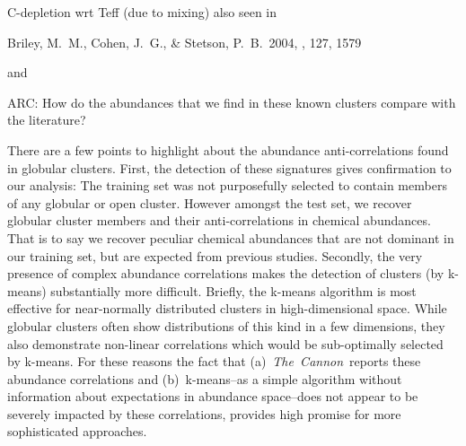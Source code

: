 \documentclass[12pt, letterpaper, preprint]{aastex}
\newcommand{\project}[1]{\textsl{#1}}
\newcommand{\thecannon}{\project{The~Cannon}}
\begin{document}
C-depletion wrt Teff (due to mixing) also seen in

  Briley, M.~M., Cohen, 
J.~G., \& Stetson, P.~B.\ 2004, \aj, 127, 1579 


and










	
ARC: How do the abundances that we find in these known clusters compare
	with the literature?


There are a few points to highlight about the abundance anti-correlations
found in globular clusters. First, the detection of these signatures gives
confirmation to our analysis: The training set was not purposefully selected
to contain members of any globular or open cluster. However amongst the test
set, we recover globular cluster members and their anti-correlations 
in chemical abundances. That is to
say we recover peculiar chemical abundances that are not dominant in our
training set, but are expected from previous studies. Secondly, the very
presence of complex abundance correlations makes the detection of clusters
(by k-means) substantially more difficult. Briefly, the k-means algorithm
is most effective for near-normally distributed clusters in high-dimensional space.
While globular clusters often show distributions of this kind in a few dimensions, they also demonstrate non-linear correlations which would be
sub-optimally selected by k-means. For these reasons the fact that (a)~\thecannon\
reports these abundance correlations and (b)~k-means--as a simple algorithm without information about expectations in abundance space--does not appear to be
severely impacted by these correlations, provides high promise for more sophisticated approaches.
\end{document}
